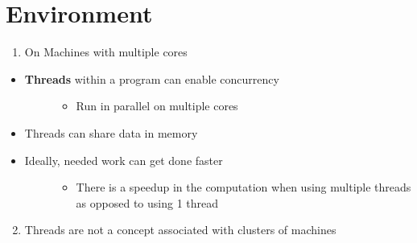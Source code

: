 \documentclass[letterpaper,10pt,openany,oneside]{sphinxmanual}
\begin{document}
\section{Environment}
\label{URLSpider/URLSpider:environment}\begin{enumerate}
\item {} 
On Machines with multiple cores

\end{enumerate}
\begin{itemize}
\item {} \begin{description}
\item[{\textbf{Threads} within a program can enable concurrency}] \leavevmode\begin{itemize}
\item {} 
Run in parallel on multiple cores

\end{itemize}

\end{description}

\item {} 
Threads can share data in memory

\item {} \begin{description}
\item[{Ideally, needed work can get done faster}] \leavevmode\begin{itemize}
\item {} 
There is a speedup in the computation when using multiple threads as opposed to using 1 thread

\end{itemize}

\end{description}

\end{itemize}
\begin{enumerate}
\setcounter{enumi}{1}
\item {} 
Threads are not a concept associated with clusters of machines

\end{enumerate}
\end{document}
